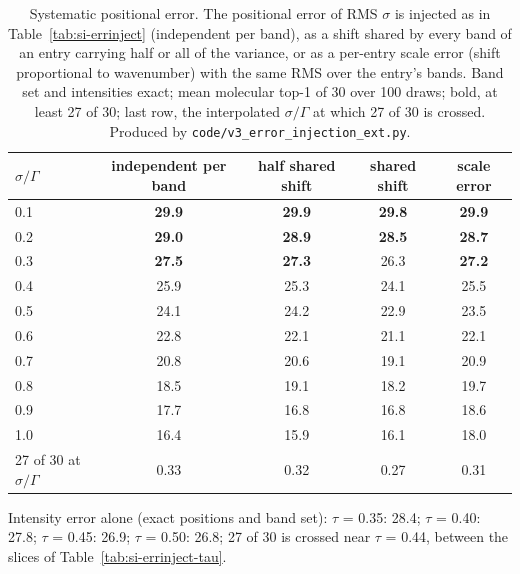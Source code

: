 \begin{table}[htbp]
\centering
\caption{Systematic positional error. The positional error of RMS $\sigma$ is injected as
in Table~\ref{tab:si-errinject} (independent per band), as a shift shared by every band of
an entry carrying half or all of the variance, or as a per-entry scale error (shift
proportional to wavenumber) with the same RMS over the entry's bands. Band set and
intensities exact; mean molecular top-1 of 30 over 100 draws; bold, at least 27 of 30; last
row, the interpolated $\sigma/\Gamma$ at which 27 of 30 is crossed. Produced by
\texttt{code/v3\_error\_injection\_ext.py}.}
\label{tab:si-errinject-ext}
\small
\begin{tabular}{lcccc}
\toprule
$\sigma/\Gamma$ & independent per band & half shared shift & shared shift & scale error \\
\midrule
0.1 & \textbf{29.9} & \textbf{29.9} & \textbf{29.8} & \textbf{29.9} \\
0.2 & \textbf{29.0} & \textbf{28.9} & \textbf{28.5} & \textbf{28.7} \\
0.3 & \textbf{27.5} & \textbf{27.3} & 26.3 & \textbf{27.2} \\
0.4 & 25.9 & 25.3 & 24.1 & 25.5 \\
0.5 & 24.1 & 24.2 & 22.9 & 23.5 \\
0.6 & 22.8 & 22.1 & 21.1 & 22.1 \\
0.7 & 20.8 & 20.6 & 19.1 & 20.9 \\
0.8 & 18.5 & 19.1 & 18.2 & 19.7 \\
0.9 & 17.7 & 16.8 & 16.8 & 18.6 \\
1.0 & 16.4 & 15.9 & 16.1 & 18.0 \\
\midrule
27 of 30 at $\sigma/\Gamma$ & 0.33 & 0.32 & 0.27 & 0.31 \\
\bottomrule
\end{tabular}

\begin{flushleft}\footnotesize Intensity error alone (exact positions and band set): $\tau$ = 0.35: 28.4; $\tau$ = 0.40: 27.8; $\tau$ = 0.45: 26.9; $\tau$ = 0.50: 26.8;
27 of 30 is crossed near $\tau$ = 0.44, between the slices of
Table~\ref{tab:si-errinject-tau}.\end{flushleft}
\end{table}

